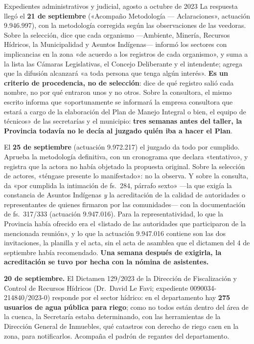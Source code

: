\begin{ficha}{Expedientes administrativos y judicial, agosto a octubre de 2023}
La respuesta llegó el \textbf{21 de septiembre} («Acompaño Metodología --- Aclaraciones», actuación 9.946.997), con la metodología corregida según las observaciones de las veedoras. Sobre la selección, dice que cada organismo ---Ambiente, Minería, Recursos Hídricos, la Municipalidad y Asuntos Indígenas--- informó los sectores con implicancias en la zona «de acuerdo a los registros de cada organismo», y suma a la lista las Cámaras Legislativas, el Concejo Deliberante y el intendente; agrega que la difusión alcanzará «a toda persona que tenga algún interés». \textbf{Es un criterio de procedencia, no de selección}: dice de qué registro salió cada nombre, no por qué entraron unos y no otros. Sobre la consultora, el mismo escrito informa que «oportunamente se informará la empresa consultora que estará a cargo de la elaboración del Plan de Manejo Integral o bien, el equipo de técnicos» de las secretarías y el municipio: \textbf{tres semanas antes del taller, la Provincia todavía no le decía al juzgado quién iba a hacer el Plan}.

El \textbf{25 de septiembre} (actuación 9.972.217) el juzgado da todo por cumplido. Aprueba la metodología definitiva, con un cronograma que declara «tentativo», y registra que la actora no había objetado la propuesta original. Sobre la selección de actores, «téngase presente lo manifestado»: no la observa. Y sobre la consulta, da «por cumplida la intimación de fs.\ 284, párrafo sexto» ---la que exigía la constancia de Asuntos Indígenas \textit{y} la acreditación de la calidad de autoridades o representantes de quienes firmaron por las comunidades--- con la documentación de fs.\ 317/333 (actuación 9.947.016). Para la representatividad, lo que la Provincia había ofrecido era el «listado de las autoridades que participaron de la mencionada reunión», y lo que la actuación 9.947.016 contiene son las dos invitaciones, la planilla y el acta, sin el acta de asamblea que el dictamen del 4 de septiembre había recomendado. \textbf{Una semana después de exigirla, la acreditación se tuvo por hecha con la nómina de asistentes.}

\textbf{20 de septiembre.} El Dictamen 129/2023 de la Dirección de Fiscalización y Control de Recursos Hídricos (Dr.\ David Le Favi; expediente 0090034-214840/2023-0) responde por el sector hídrico: en el departamento hay \textbf{275 usuarios de agua pública para riego}; como no todos están dentro del área de la cuenca, la Secretaría estaba determinando, con las herramientas de la Dirección General de Inmuebles, qué catastros con derecho de riego caen en la zona, para notificarlos. Acompaña el padrón de regantes del departamento.


\end{ficha}

